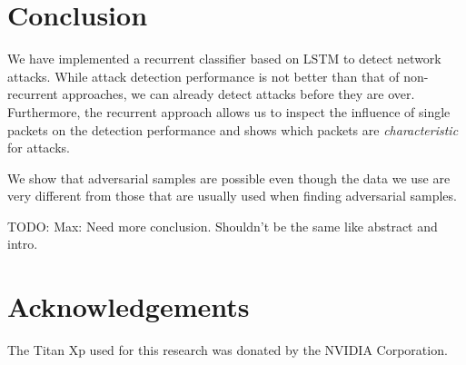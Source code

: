 \documentclass[conference]{IEEEtran}
\newcommand\note[2]{{\color{#1}#2}}
\newcommand\todo[1]{{\note{red}{TODO: #1}}}
\begin{document}


\section{Conclusion}

We have implemented a recurrent classifier based on LSTM to detect network attacks. While attack detection performance is not better than that of non-recurrent approaches, we can already detect attacks before they are over. Furthermore, the recurrent approach allows us to inspect the influence of single packets on the detection performance and shows which packets are \textit{characteristic} for attacks.

We show that adversarial samples are possible even though the data we use are very different from those that are usually used when finding adversarial samples.

\todo{Max: Need more conclusion. Shouldn't be the same like abstract and intro.}




\section*{Acknowledgements}
The Titan Xp used for this research was donated by the NVIDIA Corporation.
\end{document}
